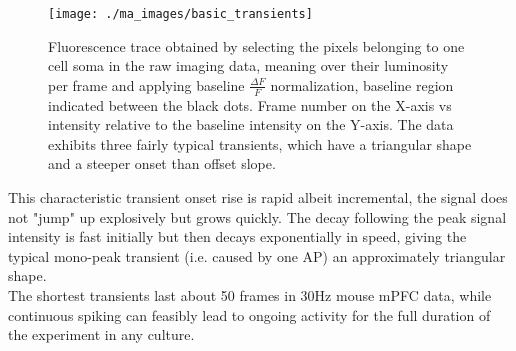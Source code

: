 \documentclass[titlepage]{article}
\begin{document}
\begin{figure}[h]
\centering
\texttt{[image: ./ma\_images/basic\_transients]}
\caption{Fluorescence trace obtained by selecting the pixels belonging to one cell soma in the raw imaging data, meaning over their luminosity per frame and applying baseline $ \frac{\Delta F}{F} $ normalization, baseline region indicated between the black dots. Frame number on the X-axis vs intensity relative to the baseline intensity on the Y-axis. The data exhibits three fairly typical transients, which have a triangular shape and a steeper onset than offset slope.}
\label{fig:basic_transients}
\end{figure}
This characteristic transient onset rise is rapid albeit incremental, the signal does not "jump" up explosively but grows quickly. The decay following the peak signal intensity is fast initially but then decays exponentially in speed, giving the typical mono-peak transient (i.e. caused by one AP) an approximately triangular shape.\\
The shortest transients last about 50 frames in 30Hz mouse mPFC data, while continuous spiking can feasibly lead to ongoing activity for the full duration of the experiment in any culture.\\
\end{document}

